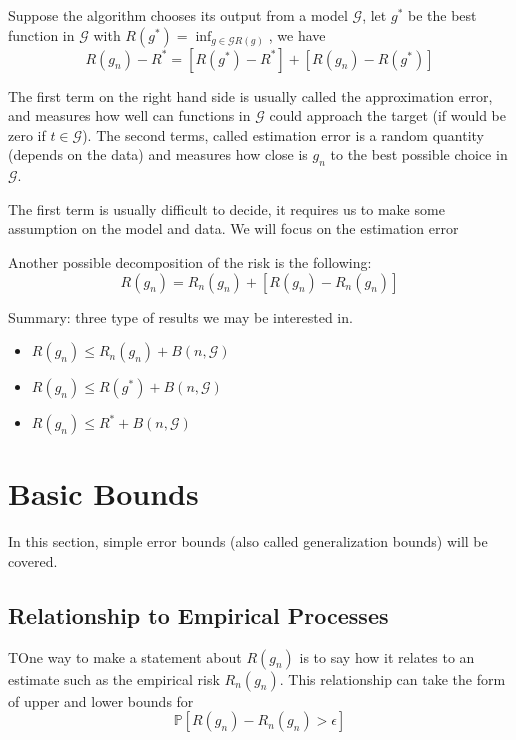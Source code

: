 \documentclass[12pt,reqno]{amsart}
\begin{document}
Suppose the algorithm chooses its output from a model $\mathcal{G}$, let $g^*$ be the best function in $\mathcal{G}$ with $R(g^*) = \inf_{g\in\mathcal{G}R(g)}$, we have
\begin{equation}
	R(g_n) - R^* = [R(g^*) - R^*] + [R(g_n) - R(g^*)]
\end{equation}

The first term on the right hand side is usually called the approximation error, and measures how well can functions in $\mathcal{G}$ could approach the target (if would be zero if $t\in \mathcal{G}$). The second terms, called estimation error is a random quantity (depends on the data) and measures how close is $g_n$ to the best possible choice in $\mathcal{G}$.

The first term is usually difficult to decide, it requires us to make some assumption on the model and data. We will focus on the estimation error

Another possible decomposition of the risk is the following:
\begin{equation}
	R(g_n) = R_n(g_n) + [R(g_n) - R_n(g_n)]
\end{equation}

Summary: three type of results we may be interested in.
\begin{itemize}
\item $R(g_n) \leq R_n(g_n) + B(n,\mathcal{G})$
\item $R(g_n) \leq R(g^*) + B(n,\mathcal{G})$
\item $R(g_n) \leq R^* + B(n,\mathcal{G})$
\end{itemize}




\section{Basic Bounds}
In this section, simple error bounds (also called generalization bounds) will be covered.

\subsection{Relationship to Empirical Processes}
TOne way to make a statement about $R(g_n)$ is to say how it relates to an estimate such as the empirical risk $R_n(g_n)$. This relationship can take the form of upper and lower bounds for
\begin{equation}
	\mathbb{P}[R(g_n) - R_n(g_n) > \epsilon]
\end{equation}
\end{document}
